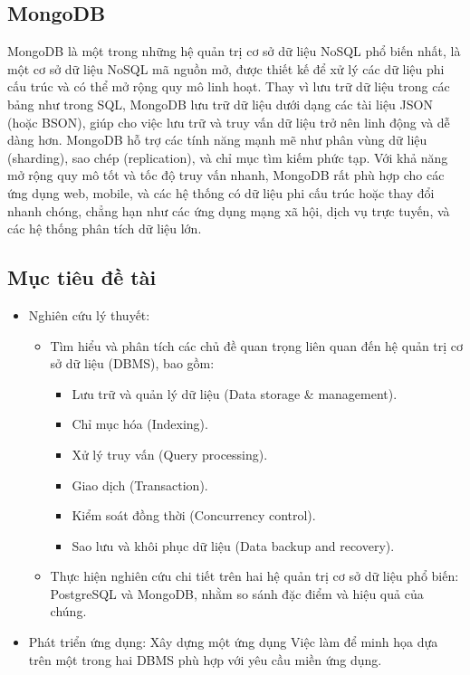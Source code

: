 \subsection{MongoDB}
\indent MongoDB là một trong những hệ quản trị cơ sở dữ liệu NoSQL phổ biến nhất, là một cơ sở dữ liệu NoSQL mã nguồn mở, được thiết kế để xử lý các dữ liệu phi cấu trúc và có thể mở rộng quy mô linh hoạt. Thay vì lưu trữ dữ liệu trong các bảng như trong SQL, MongoDB lưu trữ dữ liệu dưới dạng các tài liệu JSON (hoặc BSON), giúp cho việc lưu trữ và truy vấn dữ liệu trở nên linh động và dễ dàng hơn. MongoDB hỗ trợ các tính năng mạnh mẽ như phân vùng dữ liệu (sharding), sao chép (replication), và chỉ mục tìm kiếm phức tạp. Với khả năng mở rộng quy mô tốt và tốc độ truy vấn nhanh, MongoDB rất phù hợp cho các ứng dụng web, mobile, và các hệ thống có dữ liệu phi cấu trúc hoặc thay đổi nhanh chóng, chẳng hạn như các ứng dụng mạng xã hội, dịch vụ trực tuyến, và các hệ thống phân tích dữ liệu lớn.

\subsection{Mục tiêu đề tài}
\begin{itemize}
    \item Nghiên cứu lý thuyết:
        \begin{itemize}
            \item Tìm hiểu và phân tích các chủ đề quan trọng liên quan đến hệ quản trị cơ sở dữ liệu (DBMS), bao gồm:
                \begin{itemize}
                    \item Lưu trữ và quản lý dữ liệu (Data storage \& management).
                    \item Chỉ mục hóa (Indexing).
                    \item Xử lý truy vấn (Query processing).
                    \item Giao dịch (Transaction).
                    \item Kiểm soát đồng thời (Concurrency control).
                    \item Sao lưu và khôi phục dữ liệu (Data backup and recovery).
                \end{itemize}
            \item Thực hiện nghiên cứu chi tiết trên hai hệ quản trị cơ sở dữ liệu phổ biến: PostgreSQL và MongoDB, nhằm so sánh đặc điểm và hiệu quả của chúng.
        \end{itemize}
    \item Phát triển ứng dụng: Xây dựng một ứng dụng Việc làm để minh họa dựa trên một trong hai DBMS phù hợp với yêu cầu miền ứng dụng.
\end{itemize}
